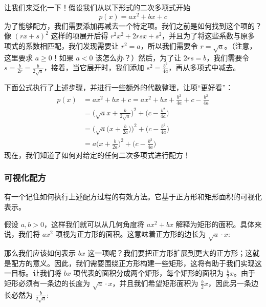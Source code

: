 让我们来泛化一下！假设我们从以下形式的二次多项式开始
\[p(x) = ax^2 + bx + c\]
为了能够配方，我们需要添加再减去一个特定项。我们之前是如何找到这个项的？像 $(rx + s)^2$ 这样的项展开后得 $r^2x^2 + 2rsx + s^2$，并且为了将这些系数与原多项式的系数相匹配，我们发现需要让 $r^2 = a$，所以我们需要令 $r = \sqrt{a}$。（注意，这里要求 $a \ge 0$！如果 $a<0$ 该怎么办？）然后，为了让 $2rs = b$，我们需要令 $s = \frac{b}{2r} = \frac{b}{2\sqrt{a}}$，接着，当它展开时，我们添加 $s^2 = \frac{b^2}{4a}$，再从多项式中减去。

下面公式执行了上述步骤，并进行一些额外的代数整理，让项``更好看''：
\begin{align*}
    p(x) &= ax^2 + bx + c = ax^2 + bx + \frac{b^2}{4a} + c - \frac{b^2}{4a}\\
    &=\Big(\sqrt{a}x+\frac{b}{2\sqrt{a}}\Big)^2+\Big(c- \frac{b^2}{4a}\Big)\\
    &=\Big(\sqrt{a}\Big(x+\frac{b}{2a}\Big)\Big)^2+\Big(c- \frac{b^2}{4a}\Big)\\
    &=a\Big(x+\frac{b}{2a}\Big)^2+\Big(c- \frac{b^2}{4a}\Big)
\end{align*}
现在，我们知道了如何对给定的任何二次多项式进行配方！

\subsubsection*{可视化配方}

有一个记住如何执行上述配方过程的有效方法。它基于正方形和矩形面积的可视化表示。

假设 $a, b>0$，这样我们就可以从几何角度将 $ax^2+bx$ 解释为矩形的面积。具体来说，我们将 $ax^2$ 项视为正方形的面积。这意味着正方形的边长为 $\sqrt{a} \cdot x$: 

\begin{center}
\end{center}

那么我们应该如何表示 $bx$ 这一项呢？我们要把正方形扩展到更大的正方形；这就是配方的意义。因此，我们需要围绕正方形构建一些矩形，这将有助于我们实现这一目标。让我们将 $bx$ 项代表的面积分成两个矩形，每个矩形的面积为 $\frac{b}{2}x$。由于矩形必须有一条边的长度为 $\sqrt{a} \cdot x$，并且我们希望矩形面积为 $\frac{b}{2}x$，因此另一条边长必然为 $\frac{b}{2\sqrt{a}}$: 

